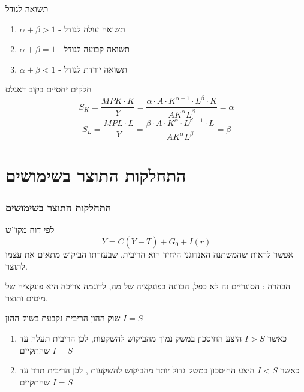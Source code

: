 \documentclass[usenames,dvipsnames]{beamer}
\begin{document}
\begin{RTL}
\begin{frame}[allowframebreaks]
        \begin{block}{תשואה לגודל}
            \begin{enumerate}
                \item $\alpha + \beta > 1 $ -  תשואה עולה לגודל
                \item $\alpha + \beta = 1 $ -  תשואה קבועה לגודל
                \item $\alpha + \beta < 1 $ -  תשואה יורדת לגודל
            \end{enumerate}
        \end{block}
    
        \framebreak

        \begin{block}{חלקים יחסיים בקוב דאגלס}
            $$S_K = \frac{MPK \cdot K}{Y} = \frac{\alpha \cdot A \cdot K^{\alpha - 1} \cdot L^\beta \cdot K}{AK^\alpha L^\beta} = \alpha$$
            $$S_L = \frac{MPL \cdot L}{Y} = \frac{\beta \cdot A \cdot K^{\alpha} \cdot L^{\beta - 1 } \cdot L }{AK^\alpha L^\beta} = \beta$$
        \end{block}

    \end{frame}


    \section{התחלקות התוצר בשימושים}
    \begin{frame}[allowframebreaks]
        \frametitle{התחלקות התוצר בשימושים}
        \begin{block}{לפי דוח מקו''ש}
        $$\bar Y = C(\bar Y - T) + G_0 + I(r)$$  
        אפשר לראות שהמשתנה האנדוגני היחיד הוא הריבית, שבעזרתו הביקוש מתאים את עצמו לתוצר.      
        \end{block}
        הבהרה : הסוגריים זה לא כפל, הכוונה בפונקציה של מה, לדוגמה צריכה היא פונקציה של מיסים ותוצר.
        
        \begin{block}{שוק ההון}
            הריבית נקבעת בשוק ההון $I = S$
            \begin{enumerate}
                \item כאשר $I > S$ היצע החיסכון במשק נמוך מהביקוש להשקעות, לכן הריבית תעלה עד שהתקיים $I = S$
                \item כאשר $I < S$ היצע החיסכון במשק גדול יותר מהביקוש להשקעות , לכן הריבית תרד עד שהתקיים $I = S$
            \end{enumerate}
        \end{block}


\end{frame}
\end{RTL}
\end{document}
